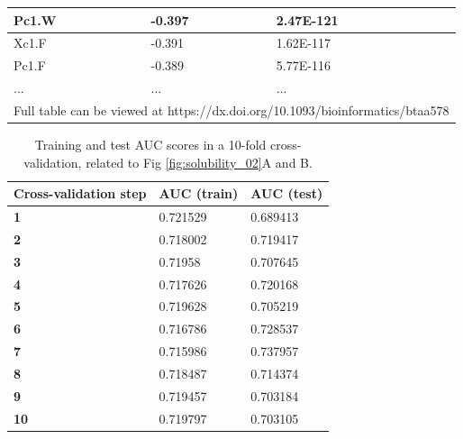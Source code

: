 \begin{table}[h]
{\begin{tabular}{|l|l|l|}
Pc1.W                           & -0.397                              & 2.47E-121                   \\ \hline
Xc1.F                           & -0.391                              & 1.62E-117                   \\ \hline
Pc1.F                           & -0.389                              & 5.77E-116                   \\ \hline
...                             & ...                                 & ...                         \\ \hline
\multicolumn{3}{|c|}{Full table can be viewed at https://dx.doi.org/10.1093/bioinformatics/btaa578} \\ \hline
\end{tabular}%
}
\end{table}

\begin{table}[h]
\centering
\caption[Training and test AUC scores in a 10-fold cross-validation.]{Training and test AUC scores in a 10-fold cross-validation, related to Fig \ref{fig:solubility_02}A and B.}
\begin{tabular}{|l|l|l|}
\hline
\textbf{Cross-validation step} & \textbf{AUC (train)} & \textbf{AUC (test)} \\ \hline
\textbf{1}                     & 0.721529             & 0.689413            \\ \hline
\textbf{2}                     & 0.718002             & 0.719417            \\ \hline
\textbf{3}                     & 0.71958              & 0.707645            \\ \hline
\textbf{4}                     & 0.717626             & 0.720168            \\ \hline
\textbf{5}                     & 0.719628             & 0.705219            \\ \hline
\textbf{6}                     & 0.716786             & 0.728537            \\ \hline
\textbf{7}                     & 0.715986             & 0.737957            \\ \hline
\textbf{8}                     & 0.718487             & 0.714374            \\ \hline
\textbf{9}                     & 0.719457             & 0.703184            \\ \hline
\textbf{10}                    & 0.719797             & 0.703105            \\ \hline
\end{tabular}

\label{tab:appendix_sodope_S3}
\end{table}


